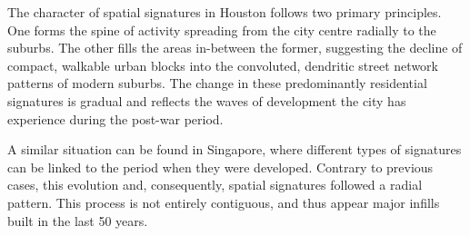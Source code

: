 The character of spatial signatures in Houston follows two primary principles.
One
forms the spine of activity spreading from the city centre radially to the suburbs. The
other fills the areas in-between the former, suggesting the decline of
compact, walkable urban blocks into the convoluted, dendritic street network patterns of
modern suburbs. The change in these predominantly residential signatures is gradual and
reflects the waves of development the city has experience during the post-war
period.

A similar situation can be found in Singapore, where different types of signatures can be linked
to the period when they were developed. Contrary
to previous cases, this evolution and, consequently, spatial signatures
followed a radial pattern. This process is not entirely contiguous, and thus
appear major infills built in the last 50 years.
